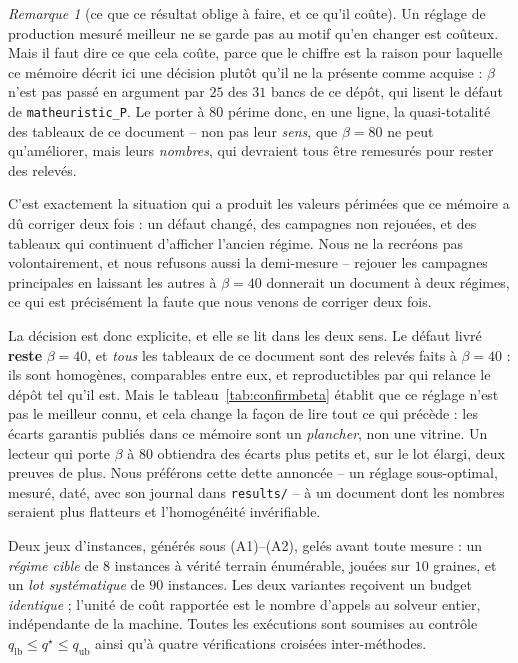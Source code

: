 \documentclass[11pt,a4paper]{article}
\theoremstyle{plain}
\theoremstyle{remark}
\newtheorem{remark}{Remarque}
\newcommand{\qs}{q^{\star}}
\begin{document}
\begin{remark}[ce que ce résultat oblige à faire, et ce qu'il coûte]
\label{rem:betaquatrevingts}
Un réglage de production mesuré meilleur ne se garde pas au motif qu'en
changer est coûteux. Mais il faut dire ce que cela coûte, parce que le
chiffre est la raison pour laquelle ce mémoire décrit ici une décision
plutôt qu'il ne la présente comme acquise : $\beta$ n'est pas passé en
argument par $25$ des $31$ bancs de ce dépôt, qui lisent le défaut de
\texttt{matheuristic\_P}. Le porter à $80$ périme donc, en une ligne, la
quasi-totalité des tableaux de ce document -- non pas leur \emph{sens}, que
$\beta=80$ ne peut qu'améliorer, mais leurs \emph{nombres}, qui devraient
tous être remesurés pour rester des relevés.

C'est exactement la situation qui a produit les valeurs périmées que ce
mémoire a dû corriger deux fois : un défaut changé, des campagnes non
rejouées, et des tableaux qui continuent d'afficher l'ancien régime. Nous ne
la recréons pas volontairement, et nous refusons aussi la demi-mesure --
rejouer les campagnes principales en laissant les autres à $\beta=40$
donnerait un document à deux régimes, ce qui est précisément la faute que
nous venons de corriger deux fois.

La décision est donc explicite, et elle se lit dans les deux sens. Le défaut
livré \textbf{reste} $\beta=40$, et \emph{tous} les tableaux de ce document
sont des relevés faits à $\beta=40$ : ils sont homogènes, comparables entre
eux, et reproductibles par qui relance le dépôt tel qu'il est. Mais le
tableau~\ref{tab:confirmbeta} établit que ce réglage n'est pas le meilleur
connu, et cela change la façon de lire tout ce qui précède : les écarts
garantis publiés dans ce mémoire sont un \emph{plancher}, non une vitrine.
Un lecteur qui porte $\beta$ à $80$ obtiendra des écarts plus petits et, sur
le lot élargi, deux preuves de plus. Nous préférons cette dette annoncée --
un réglage sous-optimal, mesuré, daté, avec son journal dans
\texttt{results/} -- à un document dont les nombres seraient plus flatteurs
et l'homogénéité invérifiable.
\end{remark}

\medskip\noindent
Deux jeux d'instances, générés sous (A1)--(A2), gelés avant toute mesure :
un \emph{régime cible} de $8$ instances à vérité terrain énumérable, jouées
sur $10$ graines, et un \emph{lot systématique} de $90$ instances. Les deux
variantes reçoivent un budget \emph{identique} ; l'unité de coût rapportée
est le nombre d'appels au solveur entier, indépendante de la machine. Toutes
les exécutions sont soumises au contrôle
$q_{\text{lb}}\le\qs\le q_{\text{ub}}$ ainsi qu'à quatre vérifications
croisées inter-méthodes.
\end{document}
